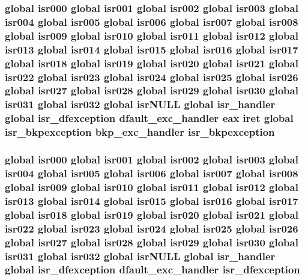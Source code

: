 \subsubsection[{\texorpdfstring{isr\+\_\+bkpexception}{isr_bkpexception}}]{\setlength{\rightskip}{0pt plus 5cm}global {\bf isr000} global {\bf isr001} global {\bf isr002} global {\bf isr003} global {\bf isr004} global {\bf isr005} global {\bf isr006} global {\bf isr007} global {\bf isr008} global {\bf isr009} global {\bf isr010} global {\bf isr011} global {\bf isr012} global {\bf isr013} global {\bf isr014} global {\bf isr015} global {\bf isr016} global {\bf isr017} global {\bf isr018} global {\bf isr019} global {\bf isr020} global {\bf isr021} global {\bf isr022} global {\bf isr023} global {\bf isr024} global {\bf isr025} global {\bf isr026} global {\bf isr027} global {\bf isr028} global {\bf isr029} global {\bf isr030} global {\bf isr031} global isr032 global isr\+N\+U\+LL global isr\+\_\+handler global {\bf isr\+\_\+dfexception} {\bf dfault\+\_\+exc\+\_\+handler} eax iret global isr\+\_\+bkpexception {\bf bkp\+\_\+exc\+\_\+handler} isr\+\_\+bkpexception}\hypertarget{isrs_8as_a79133194cfeab7a2f6fff9864ff3555a}{}\label{isrs_8as_a79133194cfeab7a2f6fff9864ff3555a}
\subsubsection[{\texorpdfstring{isr\+\_\+dfexception}{isr_dfexception}}]{\setlength{\rightskip}{0pt plus 5cm}global {\bf isr000} global {\bf isr001} global {\bf isr002} global {\bf isr003} global {\bf isr004} global {\bf isr005} global {\bf isr006} global {\bf isr007} global {\bf isr008} global {\bf isr009} global {\bf isr010} global {\bf isr011} global {\bf isr012} global {\bf isr013} global {\bf isr014} global {\bf isr015} global {\bf isr016} global {\bf isr017} global {\bf isr018} global {\bf isr019} global {\bf isr020} global {\bf isr021} global {\bf isr022} global {\bf isr023} global {\bf isr024} global {\bf isr025} global {\bf isr026} global {\bf isr027} global {\bf isr028} global {\bf isr029} global {\bf isr030} global {\bf isr031} global isr032 global isr\+N\+U\+LL global isr\+\_\+handler global isr\+\_\+dfexception {\bf dfault\+\_\+exc\+\_\+handler} isr\+\_\+dfexception}\hypertarget{isrs_8as_ae5a858bc23052c5844e8c78449c867c3}{}\label{isrs_8as_ae5a858bc23052c5844e8c78449c867c3}

